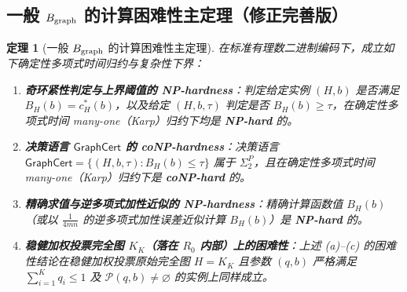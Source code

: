 \documentclass[11pt,a4paper]{ctexart}
\newtheorem{theorem}{定理}[section]
\theoremstyle{definition}
\newcommand{\GraphCert}{\mathsf{GraphCert}}
\newcommand{\1}{\boldsymbol 1}
\newcommand{\0}{\boldsymbol 0}
\begin{document}
\subsection{一般 $B_{\rm graph}$ 的计算困难性主定理（修正完善版）}
\begin{theorem}[一般 $B_{\rm graph}$ 的计算困难性主定理]\label{thm:main_hardness}
在标准有理数二进制编码下，成立如下确定性多项式时间归约与复杂性下界：
\begin{enumerate}[label=(\alph*)]
\item \textbf{奇环紧性判定与上界阈值的 NP-hardness}：判定给定实例 $(H,b)$ 是否满足 $B_H(b)=c_H^*(b)$，以及给定 $(H,b,\tau)$ 判定是否 $B_H(b)\ge \tau$，在确定性多项式时间 many-one（Karp）归约下均是 \textbf{NP-hard} 的。
\item \textbf{决策语言 $\GraphCert$ 的 coNP-hardness}：决策语言 $\GraphCert=\{(H,b,\tau):B_H(b)\le\tau\}$ 属于 $\Sigma_2^P$，且在确定性多项式时间 many-one（Karp）归约下是 \textbf{coNP-hard} 的。
\item \textbf{精确求值与逆多项式加性近似的 NP-hardness}：精确计算函数值 $B_H(b)$（或以 $\frac{1}{4mn}$ 的逆多项式加性误差近似计算 $B_H(b)$）是 \textbf{NP-hard} 的。
\item \textbf{稳健加权投票完全图 $K_K$（落在 $R_0$ 内部）上的困难性}：上述 (a)--(c) 的困难性结论在稳健加权投票原始完全图 $H=K_K$ 且参数 $(q,b)$ 严格满足 $\sum_{i=1}^K q_i\le 1$ 及 $\mathcal P(q,b)\neq\varnothing$ 的实例上同样成立。
\end{enumerate}
\end{theorem}
\end{document}

